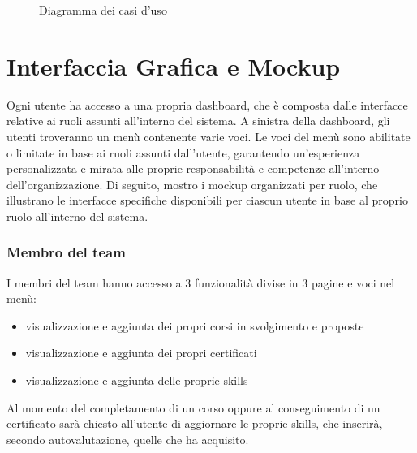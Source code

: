 \begin{figure}[ht!]  
    \centering
        \caption{Diagramma dei casi d'uso}
        \label{casi-d'uso} %
\end{figure}

\section{Interfaccia Grafica e Mockup}
Ogni utente ha accesso a una propria dashboard, che è composta dalle interfacce relative ai ruoli assunti all'interno del sistema. A sinistra della dashboard, gli utenti troveranno un menù contenente varie voci. Le voci del menù sono abilitate o limitate in base ai ruoli assunti dall'utente, garantendo un'esperienza personalizzata e mirata alle proprie responsabilità e competenze all'interno dell'organizzazione. Di seguito, mostro i mockup organizzati per ruolo, che illustrano le interfacce specifiche disponibili per ciascun utente in base al proprio ruolo all'interno del sistema.

\subsubsection{Membro del team}
I membri del team hanno accesso a 3 funzionalità divise in 3 pagine e voci nel menù:  
\begin{itemize}
    \item visualizzazione e aggiunta dei propri corsi in svolgimento e proposte
    \item visualizzazione e aggiunta dei propri certificati
    \item visualizzazione e aggiunta delle proprie skills 
\end{itemize}
Al momento del completamento di un corso oppure al conseguimento di un certificato sarà chiesto all’utente di aggiornare le proprie skills, che inserirà, secondo autovalutazione, quelle che ha acquisito.


